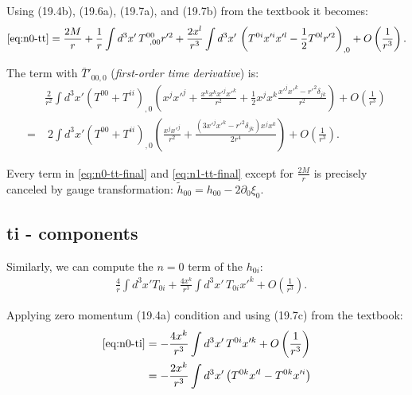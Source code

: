 \documentclass[aps,prd,preprint]{revtex4-1}
\begin{document}
Using (19.4b), (19.6a), (19.7a), and (19.7b) from the textbook it becomes:
\begin{align}
\eqref{eq:n0-tt} = \frac{2 M}{r} + \frac{1}{r} \int d^3 x' \, T^{00}_{\; \; ,00} r'^2 +
  \frac{2 x^l}{r^3} \int d^3 x' \, \left( T^{0i} x'^i x'^l - \frac{1}{2} T^{0l} r'^2 \right)_{, 0} +
  O\left(\frac{1}{r^3} \right) \label{eq:n0-tt-final}.
\end{align}

The term with $\bar{T}'_{00,0}$ (\emph{first-order time derivative}) is:
\begin{align}
& \frac{2}{r^2} \int d^3 x' \left( T^{00} + T^{ii} \right)_{, 0} \left( x^j x'^j + \frac{x^k x^k x'^j x'^k}{r^2} + \frac{1}{2} x^j x^k
  \frac{x'^j x'^k - r'^2 \delta_{jk}}{r^2} \right) + O\left(\frac{1}{r^3} \right) \\
  = & \; 2 \int d^3 x' \left( T^{00} + T^{ii} \right)_{, 0} \left( \frac{x^j x'^j}{r^2} + \frac{\left(3 x'^j x'^k - r'^2 \delta_{jk} \right) x^j x^k}{2 r^4} \right) + O\left(\frac{1}{r^3}\right) \label{eq:n1-tt-final}.
\end{align}

Every term in \eqref{eq:n0-tt-final} and \eqref{eq:n1-tt-final} except for $\frac{2 M}{r}$ is precisely canceled by
gauge transformation: $\tilde{h}_{00} = h_{00} - 2 \partial_0 \xi_0$.

\subsection{ti - components}

Similarly, we can compute the $n = 0$ term of the $h_{0i}$:
\begin{align}\label{eq:n0-ti}
& \frac{4}{r} \int d^3 x' T_{0i} + \frac{4 x^k}{r^3} \int d^3 x' \, T_{0i} x'^k +
  O\left(\frac{1}{r^3} \right).
\end{align}

Applying zero momentum (19.4a) condition and using (19.7c) from the textbook:
\begin{align}
\eqref{eq:n0-ti} & = -\frac{4 x^k}{r^3} \int d^3 x' \, T^{0i} x'^k + O\left(\frac{1}{r^3} \right) \\
& = -\frac{2 x^k}{r^3} \int d^3 x' \left( T^{0k}  x'^l - T^{0k} x'^i \right)
\end{align}
\end{document}
